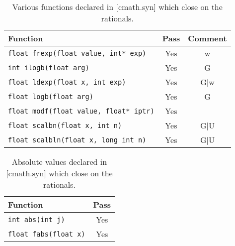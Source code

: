 \documentclass[prd,twocolumn,amsmath,amssymb,nofootinbib,eqsecnum]{revtex4-1}
\newcommand{\code}[1]{{\tt #1}}
\begin{document}
\begin{table}[h]
	\begin{tabular}{lcc}
		Function & Pass & Comment
	\\
	\hline \hline
		\code{float frexp(float value, int* exp)} & Yes & w
	\\
	\hline
		\code{int ilogb(float arg)} & Yes & G
	\\
	\hline
		\code{float ldexp(float x, int exp)} & Yes & G$\vert$w		
	\\
	\hline
		\code{float logb(float arg)} & Yes & G
	\\
	\hline
		\code{float modf(float value, float* iptr)} & Yes &
	\\
	\hline
		\code {float scalbn(float x, int n)} & Yes & G$\vert$U
	\\
	\hline
		\code {float scalbln(float x, long int n)} & Yes & G$\vert$U
	\end{tabular}
\caption{Various functions declared in [cmath.syn] which close on the rationals.}
\label{tab:26.9.1}
\end{table}


\begin{table}[h]
	\begin{tabular}{lc}
		Function & Pass
	\\
	\hline \hline
		\code{int abs(int j)} & Yes
	\\
	\hline
		\code{float fabs(float x)} & Yes
	\end{tabular}
\caption{Absolute values declared in [cmath.syn]  which close on the rationals.}
\label{tab:26.9.2}
\end{table}
\end{document}

